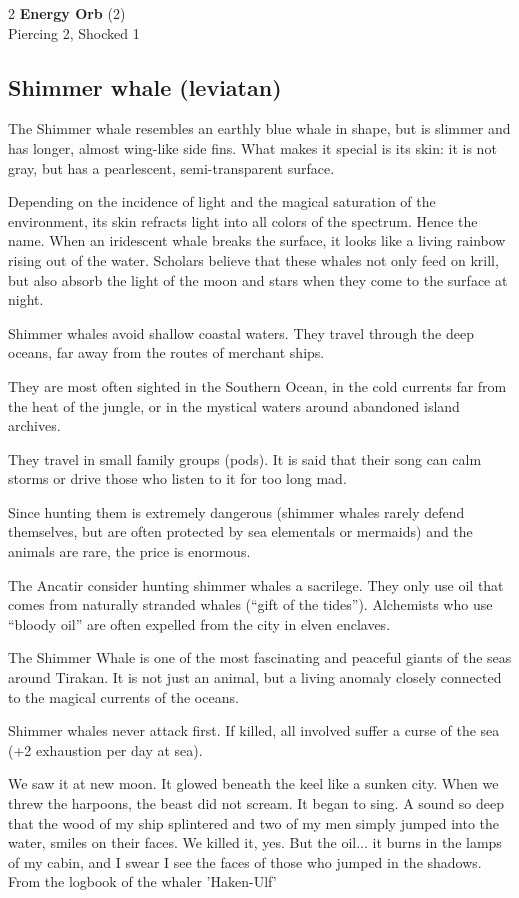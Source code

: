 \begin{multicols}{2}
    \textbf{Energy Orb} (2)\\
    Piercing 2, Shocked 1\\


    \subsection*{Shimmer whale (leviatan)}

    The Shimmer whale resembles an earthly blue whale in shape, but is slimmer and has longer, almost wing-like side fins. What makes it special is its skin: it is not gray, but has a pearlescent, semi-transparent surface.

Depending on the incidence of light and the magical saturation of the environment, its skin refracts light into all colors of the spectrum. Hence the name. When an iridescent whale breaks the surface, it looks like a living rainbow rising out of the water.
Scholars believe that these whales not only feed on krill, but also absorb the light of the moon and stars when they come to the surface at night.

Shimmer whales avoid shallow coastal waters. They travel through the deep oceans, far away from the routes of merchant ships.

They are most often sighted in the Southern Ocean, in the cold currents far from the heat of the jungle, or in the mystical waters around abandoned island archives.

They travel in small family groups (pods). It is said that their song can calm storms or drive those who listen to it for too long mad.

Since hunting them is extremely dangerous (shimmer whales rarely defend themselves, but are often protected by sea elementals or mermaids) and the animals are rare, the price is enormous.

The Ancatir consider hunting shimmer whales a sacrilege. They only use oil that comes from naturally stranded whales (“gift of the tides”). Alchemists who use “bloody oil” are often expelled from the city in elven enclaves.

The Shimmer Whale is one of the most fascinating and peaceful giants of the seas around Tirakan. It is not just an animal, but a living anomaly closely connected to the magical currents of the oceans.

Shimmer whales never attack first. If killed, all involved suffer a curse of the sea (+2 exhaustion per day at sea).

We saw it at new moon. It glowed beneath the keel like a sunken city. When we threw the harpoons, the beast did not scream. It began to sing. A sound so deep that the wood of my ship splintered and two of my men simply jumped into the water, smiles on their faces. We killed it, yes. But the oil... it burns in the lamps of my cabin, and I swear I see the faces of those who jumped in the shadows.
From the logbook of the whaler 'Haken-Ulf'


\end{multicols}
